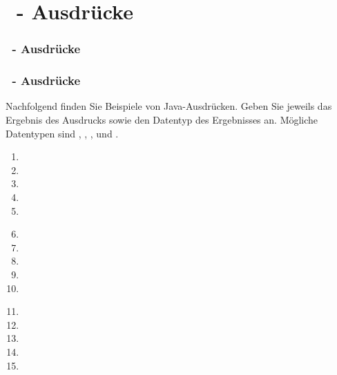 \def\stitle{\theexercise\ - Ausdrücke}
\section{\stitle}
\begin{frame}%
  \frametitle{\stitle}%
\tableofcontents[current]
\end{frame}


\begin{frame}[t]
  \frametitle{\stitle}

Nachfolgend finden Sie Beispiele von Java-Ausdrücken.
Geben Sie jeweils das Ergebnis des Ausdrucks sowie den Datentyp des Ergebnisses an.
Mögliche Datentypen sind , , ,  und .
\begin{center}
\begin{minipage}{0.3\textwidth}
\begin{enumerate}
\item {}
\item {}
\item {}
\item {}
\item {}
\end{enumerate}
\end{minipage}
\begin{minipage}{0.3\textwidth}
\begin{enumerate}
\setcounter{enumi}{5}
\item {}
\item {}
\item {}
\item {}
\item {}
\end{enumerate}
\end{minipage}
\begin{minipage}{0.3\textwidth}
\begin{enumerate}
\setcounter{enumi}{10}
\item {}
\item {}
\item {}
\item {}
\item {}
\end{enumerate}
\end{minipage}
\end{center}

\end{frame}

